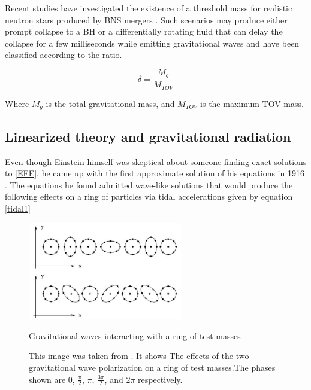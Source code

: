 \FloatBarrier

Recent studies have investigated the existence of a threshold mass for realistic neutron stars produced by BNS mergers \cite{Kashyap_2022}. Such scenarios may produce either prompt collapse to a BH or a differentially rotating fluid that can delay the collapse for a few milliseconds while emitting gravitational waves and have been classified according to the ratio.

\begin{equation}\label{delta}
\delta=\frac{M_g}{M_{TOV}}
\end{equation} 

Where $M_g$ is the total gravitational mass, and $M_{TOV}$ is the maximum TOV mass.





\subsection{Linearized theory and gravitational radiation}\label{GW}

Even though Einstein himself was skeptical about someone finding exact solutions to \ref{EFE}, he came up with the first approximate solution of his equations in 1916 \cite{Einstein:1916cc}. The equations he found admitted wave-like solutions that would produce the following effects on a ring of particles via tidal accelerations given by equation \ref{tidal1}


\begin{figure}[hbt!]
\begin{center}
\includegraphics[width=0.6\textwidth, angle=0]{images/particle-ring.png}
\captionsetup{width=0.8\textwidth}
\caption{Gravitational waves interacting with a ring of test masses}
\caption*{This image was taken from \cite{carroll-notes}.  It shows The effects of the two gravitational wave polarization on a ring of test masses.The phases shown are 0, $\frac{\pi}{2}$, $\pi$, $\frac{3\pi}{2}$, and $2\pi$ respectively.
}
\label{GW passing through a ring of test masses}
\end{center}
\end{figure}

